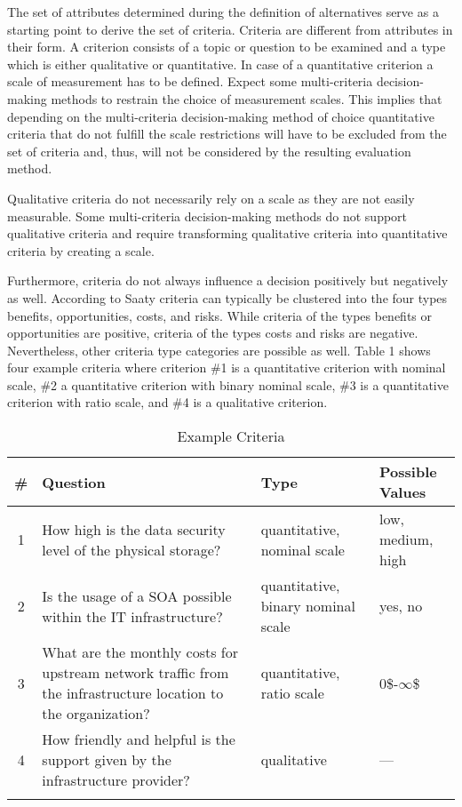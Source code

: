 \documentclass[journal,final,a4paper,twoside]{IEEEtran}
\begin{document}
The set of attributes determined during the definition of alternatives serve as a starting point to derive the set of criteria. Criteria are different from attributes in their form. A criterion consists of a topic or question to be examined and a type which is either qualitative or quantitative. 
In case of a quantitative criterion a scale of measurement has to be defined. Expect some multi-criteria decision-making methods to restrain the choice of measurement scales. This implies that depending on the multi-criteria decision-making method of choice quantitative criteria that do not fulfill the scale restrictions will have to be excluded from the set of criteria and, thus, will not be considered by the resulting evaluation method. 

Qualitative criteria do not necessarily rely on a scale as they are not easily measurable. Some multi-criteria decision-making methods do not support qualitative criteria and require transforming qualitative criteria into quantitative criteria by creating a scale.

Furthermore, criteria do not always influence a decision positively but negatively as well. According to Saaty \cite{saatybook2005} criteria can typically be clustered into the four types benefits, opportunities, costs, and risks. While criteria of the types benefits or opportunities are positive, criteria of the types costs and risks are negative. Nevertheless, other criteria type categories are possible as well.
Table 1 shows four example criteria where criterion \#1 is a quantitative criterion with nominal scale, \#2 a quantitative criterion with binary nominal scale, \#3 is a quantitative criterion with ratio scale, and \#4 is a qualitative criterion.
\begin{table}[!t]
\renewcommand{\arraystretch}{1.3}
\caption{Example Criteria}
\label{table_examplecriteria}
\centering
\begin{tabular}{| c | m{1in} | m{.7in} | m{.5in} |}
\firsthline
\# & Question & Type & Possible Values\\
\hline
1 & How high is the data security level of the physical storage? & quantitative, nominal scale & low, medium, high \\
\hline
2 & Is the usage of a SOA possible within the IT infrastructure? & quantitative, binary nominal scale & yes, no \\
\hline
3 & What are the monthly costs for upstream network traffic from the infrastructure location to the organization? & quantitative, ratio scale & 0\$-$\infty$\$ \\
\hline
4 & How friendly and helpful is the support given by the infrastructure provider? & qualitative & --- \\
\lasthline
\end{tabular}
\end{table}
\end{document}
